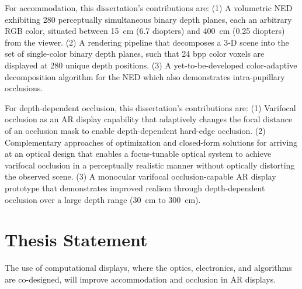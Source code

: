 For accommodation, this dissertation's contributions are: (1) A volumetric NED exhibiting 280 perceptually simultaneous binary depth planes, each an arbitrary RGB color, situated between 15~cm (6.7 diopters) and 400~cm (0.25 diopters) from the viewer. (2) A rendering pipeline that decomposes a 3-D scene into the set of single-color binary depth planes, such that 24 bpp color voxels are displayed at 280 unique depth positions. (3) A yet-to-be-developed color-adaptive decomposition algorithm for the NED which also demonstrates intra-pupillary occlusions.

For depth-dependent occlusion, this dissertation's contributions are: (1) Varifocal occlusion as an AR display capability that adaptively changes the focal distance of an occlusion mask to enable depth-dependent hard-edge occlusion. (2) Complementary approaches of optimization and closed-form solutions for arriving at an optical design that enables a focus-tunable optical system to achieve varifocal occlusion in a perceptually realistic manner without optically distorting the observed scene. (3) A monocular varifocal occlusion-capable AR display prototype that demonstrates improved realism through depth-dependent occlusion over a large depth range (30~cm to 300~cm).


\section{Thesis Statement}
The use of computational displays, where the optics, electronics, and algorithms are co-designed, will improve accommodation and occlusion in AR displays. 
